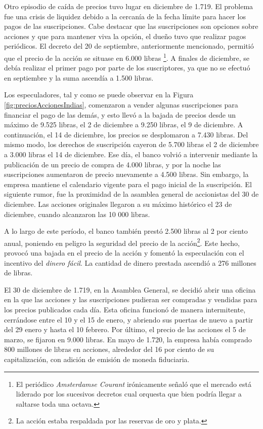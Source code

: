 Otro episodio de caída de precios tuvo lugar en diciembre de 1.719. El problema fue una crisis de liquidez debido a la cercanía de la fecha límite para hacer los pagos de las suscripciones. Cabe destacar que las suscripciones son opciones sobre acciones y que para mantener viva la opción, el dueño tuvo que realizar pagos periódicos. El decreto del 20 de septiembre, anteriormente mencionado, permitió que el precio de la acción se situase en 6.000 libras	\footnote{El periódico \emph{Amsterdamse Courant} irónicamente señaló que el mercado está liderado por los sucesivos decretos cual orquesta que bien podría llegar a saltarse toda una octava.}. A finales de diciembre, se debía realizar el primer pago por parte de los suscriptores, ya que no se efectuó en septiembre y la suma ascendía a 1.500 libras.

Los especuladores, tal y como se puede observar en la Figura \ref{fig:preciosAccionesIndias},  comenzaron a vender algunas suscripciones para financiar el pago de las demás, y esto llevó a la bajada de precios desde un máximo de 9.525 libras, el 2 de diciembre a 9.250 libras, el 9 de diciembre. A continuación, el 14 de diciembre, los precios se desplomaron a 7.430 libras. Del mismo modo, los derechos de suscripción cayeron de 5.700 libras el 2 de diciembre a 3.000 libras el 14 de diciembre. Ese día, el banco volvió a intervenir mediante la publicación de un precio de compra de 4.000 libras, y por la noche las suscripciones aumentaron de precio nuevamente a 4.500 libras. Sin embargo, la empresa mantiene el calendario vigente para el pago inicial de la suscripción. El siguiente rumor, fue la proximidad de la asamblea general de accionistas del 30 de diciembre. Las acciones originales llegaron a su máximo histórico el 23 de diciembre, cuando alcanzaron las 10 000 libras.

A lo largo de este período, el banco también prestó 2.500 libras al 2 por ciento anual, poniendo en peligro la seguridad del precio de la acción\footnote{La acción estaba respaldada por las reservas de oro y plata.}. Este hecho,  provocó una bajada en el precio de la acción y fomentó la especulación con el incentivo del \emph{dinero fácil}. La cantidad de dinero prestada ascendió a 276 millones de libras.

El 30 de diciembre de 1.719, en la Asamblea General, se decidió abrir una oficina en la que las acciones y las suscripciones pudieran ser compradas y vendidas para los precios publicados cada día. Esta oficina funcionó de manera intermitente, cerrándose entre el 10 y el 15 de enero, y abriendo sus puertas de nuevo a partir del 29 enero y hasta el 10 febrero. Por último, el precio de las acciones el 5 de marzo, se fijaron en 9.000 libras. En mayo de 1.720, la empresa había comprado 800 millones de libras en acciones, alrededor del 16 por ciento de su capitalización, con adición de emisión de moneda fiduciaria.

